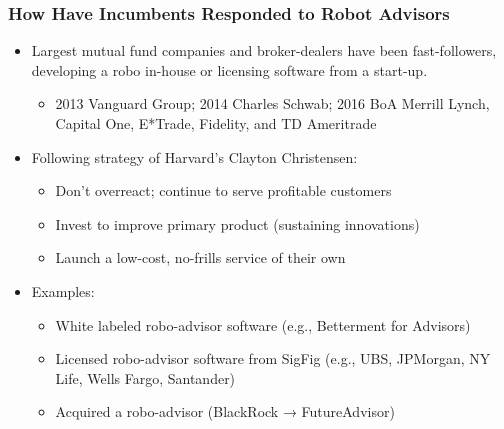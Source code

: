 \begin{frame}
\frametitle{How Have Incumbents Responded to Robot Advisors}


\vspace{-2mm}
\begin{itemize}
    \item Largest mutual fund companies and broker-dealers have been fast-followers, developing a robo in-house or licensing software from a start-up.
    \begin{itemize}
        \item 2013 Vanguard Group; 2014 Charles Schwab; 2016 BoA Merrill Lynch, Capital One, E*Trade, Fidelity, and TD Ameritrade
    \end{itemize}
    \item Following strategy of Harvard’s Clayton Christensen:
    \begin{itemize}
        \item Don't overreact; continue to serve profitable customers
        \item Invest to improve primary product (sustaining innovations)
        \item Launch a low-cost, no-frills service of their own
    \end{itemize}
    \item Examples: 
    \begin{itemize}
        \item White labeled robo-advisor software (e.g., Betterment for Advisors)
        \item Licensed robo-advisor software from SigFig (e.g., UBS, JPMorgan, NY Life, Wells Fargo, Santander)
        \item Acquired a robo-advisor (BlackRock → FutureAdvisor)
    \end{itemize}
\end{itemize}

\end{frame}





